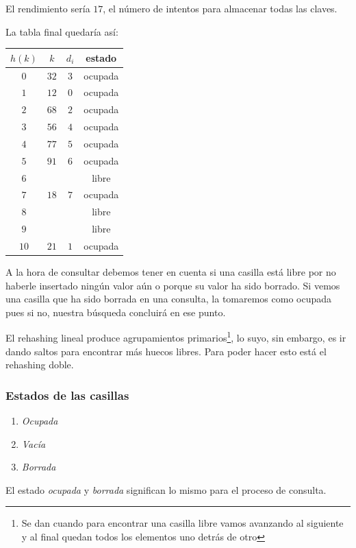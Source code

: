 \documentclass[10pt,a4paper,spanish]{report}
\begin{document}
\noindent
El rendimiento sería $17$, el número de intentos para almacenar todas las claves.

\noindent
La tabla final quedaría así:


\begin{tabular}{c | c | c | c}
$h(k)$ & $k$ & $d_i$ & estado \\
\hline
$0$ & $32$ & $3$ & ocupada \\
$1$ & $12$ & $0$ & ocupada \\
$2$ & $68$ & $2$ & ocupada \\
$3$ & $56$ & $4$ & ocupada \\
$4$ & $77$ & $5$ & ocupada \\
$5$ & $91$ & $6$ & ocupada \\
$6$ & & & libre \\
$7$ & $18$ & $7$ & ocupada \\
$8$ & & & libre \\
$9$ & & & libre \\
$10$ & $21$ & $1$ & ocupada \\
\end{tabular}

\noindent
A la hora de consultar debemos tener en cuenta si una casilla está libre por no haberle insertado ningún valor aún o porque su valor ha sido borrado. Si vemos una casilla que ha sido borrada en una consulta, la tomaremos como ocupada pues si no, nuestra búsqueda concluirá en ese punto.

\noindent
El rehashing lineal produce agrupamientos primarios\footnote{Se dan cuando para encontrar una casilla libre vamos avanzando al siguiente y al final quedan todos los elementos uno detrás de otro}, lo suyo, sin embargo, es ir dando saltos para encontrar más huecos libres. Para poder hacer esto está el rehashing doble.

\subsubsection{\textcolor[rgb]{0.3,0.4,0.8}Estados de las casillas}
\begin{enumerate}[$\clubsuit$]
      \item \textit{\textcolor[rgb]{0.3,0.4,0.8}{Ocupada}}
      \item \textit{\textcolor[rgb]{0.3,0.4,0.8}{Vacía}}
      \item \textit{\textcolor[rgb]{0.3,0.4,0.8}{Borrada}}
\end{enumerate}

\noindent
El estado \textit{\textcolor[rgb]{0.3,0.4,0.8}{ocupada}} y \textit{\textcolor[rgb]{0.3,0.4,0.8}{borrada}} significan lo mismo para el proceso de consulta.
\end{document}
